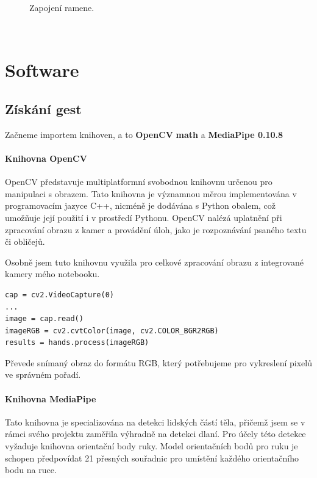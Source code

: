 \documentclass[12pt, a4paper,
twoside,        %
openright
]{report}
\let\oldchapter\chapter
\renewcommand{\chapter}{
	\clearpage
	\pagestyle{fancy}
	\fancyhf{}
	\renewcommand{\headrulewidth}{0pt}
	\fancyfoot[c]{\thepage}
	\
	\oldchapter
}
\renewcommand{\headrulewidth}{0.025pt}
\begin{document}
{\begin{figure}[h]
	
	\caption{Zapojení ramene.} %
	\label{fig:obvod} %
\end{figure}
\chapter{Software}

\section{Získání gest}
Začneme importem knihoven, a to \textbf{OpenCV}  \textbf{math} a \textbf{MediaPipe 0.10.8}  

\subsubsection{Knihovna OpenCV}

OpenCV představuje multiplatformní svobodnou knihovnu určenou pro manipulaci s obrazem. Tato knihovna je významnou měrou implementována v programovacím jazyce C++, nicméně je dodávána s Python obalem, což umožňuje její použití i v prostředí Pythonu. OpenCV nalézá uplatnění při zpracování obrazu z kamer a provádění úloh, jako je rozpoznávání psaného textu či obličejů.

Osobně jsem tuto knihovnu využila pro celkové zpracování obrazu z integrované kamery mého notebooku.

\begin{lstlisting}[style=Python, caption={Obraz, a jeho převedení do správného formátu}]
cap = cv2.VideoCapture(0)
...
image = cap.read()
imageRGB = cv2.cvtColor(image, cv2.COLOR_BGR2RGB)
results = hands.process(imageRGB)
\end{lstlisting}

Převede snímaný obraz do formátu RGB, který potřebujeme pro vykreslení pixelů ve správném pořadí.

\subsubsection{Knihovna MediaPipe}
Tato knihovna je specializována na detekci lidských částí těla, přičemž jsem se v rámci svého projektu zaměřila výhradně na detekci dlaní. Pro účely této detekce vyžaduje knihovna orientační body ruky. Model orientačních bodů pro ruku je schopen předpovídat 21 přesných souřadnic pro umístění každého orientačního bodu na ruce.



}
\end{document}

